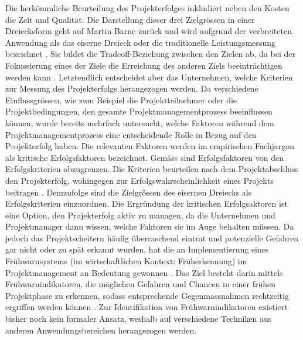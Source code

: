 Die herkömmliche Beurteilung des Projekterfolges inkludiert neben den Kosten die Zeit und Qualität\citep{Atk1999}. Die Darstellung dieser drei Zielgrössen in einer Dreiecksform geht auf Martin Barne zurück und wird aufgrund der verbreiteten Anwendung als das eiserne Dreieck oder die traditionelle Leistungsmessung bezeichnet \citep{kerz14,lock07}. Sie bildet die Tradeoff-Beziehung zwischen den Zielen ab, da bei der Fokussierung eines der Ziele die Erreichung des anderen Ziels beeinträchtigen werden kann \citep[S.~21]{lock07}. Letztendlich entscheidet aber das Unternehmen, welche Kriterien zur Messung des Projekterfolgs herangezogen werden. Da verschiedene Einflussgrössen, wie zum Beispiel die Projektteilnehmer oder die Projektbedingungen, den gesamte Projektmanagementprozess beeinflussen können, wurde bereits mehrfach untersucht, welche Faktoren während dem Projektmanagementprozess eine entscheidende Rolle in Bezug auf den Projekterfolg haben. Die relevanten Faktoren werden im empirischen Fachjargon als kritische Erfolgsfaktoren bezeichnet. Gemäss \citet{BeDeNov2015} sind Erfolgsfaktoren von den Erfolgskriterien abzugrenzen. Die Kriterien beurteilen nach dem Projektabschluss den Projekterfolg, wohingegen zur Erfolgswahrscheinlichkeit eines Projekts beitragen \citep*{BeDeNov2015}. Demzufolge sind die Zielgrössen des eisernen Dreiecks als Erfolgskriterien einzuordnen. Die Ergründung der kritischen Erfolgsaktoren ist eine Option, den Projekterfolg aktiv zu managen, da die Unternehmen und Projektmanager dann wissen, welche Faktoren sie im Auge behalten müssen. Da jedoch das Projektscheitern häufig überraschend eintrat und potenzielle Gefahren gar nicht oder zu spät erkannt wurden, hat die an Implementierung eines Frühwarnsystems (im wirtschaftlichen Kontext: Früherkennung) im Projektmanagement an Bedeutung gewonnen \citep*{WiKlak12,haan13}. Das Ziel besteht darin mittels Frühwarnindikatoren, die möglichen Gefahren und Chancen in einer frühen Projektphase zu erkennen, sodass entsprechende Gegenmassnahmen rechtzeitig ergriffen werden können \citep{haankra13}. Zur Identifikation von Frühwarnindikatoren existiert bisher noch kein formaler Ansatz, weshalb auf verschiedene Techniken aus anderen Anwendungsbereichen herangezogen werden.
\newline\newline
